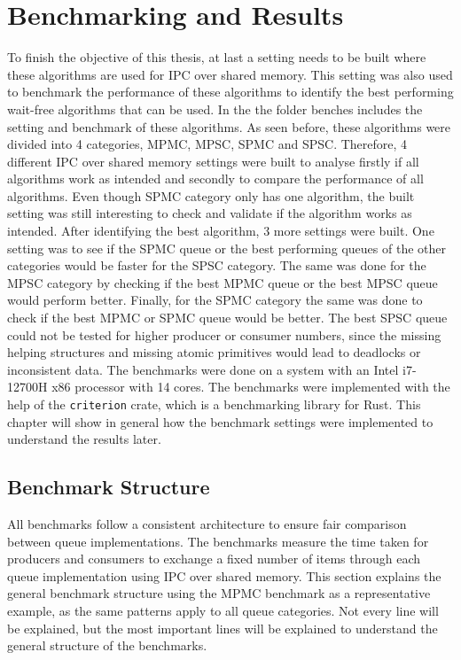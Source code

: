 \chapter{Benchmarking and Results}\label{ch:results}
To finish the objective of this thesis, at last a setting needs to be built where these algorithms are used for \ac{IPC} over shared memory. This setting was also used to benchmark the performance of these algorithms to identify the best performing wait-free algorithms that can be used. In the \cite{githubMA} the folder benches includes the setting and benchmark of these algorithms. As seen before, these algorithms were divided into 4 categories, \ac{MPMC}, \ac{MPSC}, \ac{SPMC} and \ac{SPSC}. Therefore, 4 different \ac{IPC} over shared memory settings were built to analyse firstly if all algorithms work as intended and secondly to compare the performance of all algorithms. Even though \ac{SPMC} category only has one algorithm, the built setting was still interesting to check and validate if the algorithm works as intended. After identifying the best algorithm, 3 more settings were built. One setting was to see if the \ac{SPMC} queue or the best performing queues of the other categories would be faster for the \ac{SPSC} category. The same was done for the \ac{MPSC} category by checking if the best \ac{MPMC} queue or the best \ac{MPSC} queue would perform better. Finally, for the \ac{SPMC} category the same was done to check if the best \ac{MPMC} or \ac{SPMC} queue would be better. The best \ac{SPSC} queue could not be tested for higher producer or consumer numbers, since the missing helping structures and missing atomic primitives would lead to deadlocks or inconsistent data. The benchmarks were done on a system with an Intel i7-12700H x86 processor with 14 cores. The benchmarks were implemented with the help of the \texttt{criterion} crate, which is a benchmarking library for Rust. This chapter will show in general how the benchmark settings were implemented to understand the results later.

\section{Benchmark Structure}
All benchmarks follow a consistent architecture to ensure fair comparison between queue implementations. The benchmarks measure the time taken for producers and consumers to exchange a fixed number of items through each queue implementation using \ac{IPC} over shared memory. This section explains the general benchmark structure using the \ac{MPMC} benchmark as a representative example, as the same patterns apply to all queue categories. Not every line will be explained, but the most important lines will be explained to understand the general structure of the benchmarks. 


